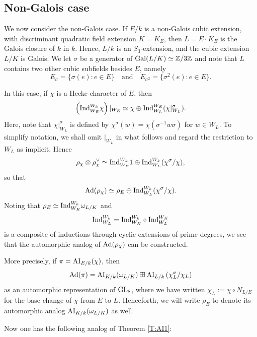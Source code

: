 \documentclass[11pt]{amsart}
\theoremstyle{plain}
\numberwithin{equation}{section}
\newcommand{\Z}{\mathbb Z}
\def\GL{{\rm GL}}
\def\Z{{\mathbb Z}}
\begin{document}
\vskip 5pt

\subsection{\bf Non-Galois case}
We now consider the non-Galois case. 
If $E/k$ is a non-Galois cubic extension, with discriminant quadratic field extension $K = K_E$, then $L = E \cdot K_E$ is the Galois closure of $k$ in $\overline{k}$. Hence,  $L/k$ is an $S_3$-extension, and the cubic extension $L/K$ is Galois. We let $\sigma$ be a generator of ${\rm Gal}(L/K) \simeq \Z/3\Z$ and note that $L$ contains two other cubic subfields besides $E$, namely 
\[ E_{\sigma} =\{ \sigma(e) : e \in E \} \quad \text{and} \quad  E_{\sigma^2} = \{ \sigma^2(e): e \in E\}. \]
\vskip 5pt

In this case, if $\chi$ is a Hecke character of $E$, then 
\[ \left( {\rm Ind}_{W_E}^{W_k} \chi \right)|_{W_E} \simeq \chi \oplus {\rm Ind}_{W_L}^{W_E} (\chi|_{W_L}^{\sigma}). \]
Here, note that $\chi|_{W_L}^{\sigma}$  is  defined by $\chi^{\sigma}(w) = \chi(\sigma^{-1}w \sigma)$  for  $w \in W_L$. To simplify notation, we shall omit $|_{W_L}$ in what follows and regard the restriction to $W_L$ as implicit.
Hence
\[  \rho_{\chi} \otimes \rho_{\chi}^{\vee} \simeq  {\rm Ind}_{W_E}^{W_k} 1  \oplus  {\rm Ind}_{W_L}^{W_k}  (\chi^{\sigma}/ \chi),\]
so that
\[  {\rm Ad}(\rho_{\chi}) \simeq  \rho_E \oplus {\rm Ind}_{W_L}^{W_k}  (\chi^{\sigma}/ \chi). \]
Noting that $\rho_E \simeq {\rm Ind}_{W_K}^{W_k} \omega_{L/K}$ and 
\[  {\rm Ind}_{W_L}^{W_k}  = {\rm Ind}_{W_K}^{W_k}  \circ {\rm Ind}_{W_L}^{W_K} \]
is a composite of inductions through cyclic extensions of prime degrees, we see that the automorphic analog of ${\rm Ad}(\rho_{\chi})$ can be constructed.

\vskip 5pt

More precisely, if $\pi = {\rm AI}_{E/k}(\chi)$, then
\begin{equation} \label{E:Add2}
  {\rm Ad}(\pi)  =  {\rm AI}_{K/k}(\omega_{L/K})  \boxplus {\rm AI}_{L/k}\left(  \chi_L^{\sigma} / \chi_L \right) \end{equation}
as an automorphic representation of $\GL_8$, where we have written $\chi_L := \chi \circ N_{L/E}$ for the base change of $\chi$ from $E$ to $L$.
Henceforth, we will write $\rho_E$ to denote its automorphic analog $ {\rm AI}_{K/k}(\omega_{L/K})$ as well.  
 

\vskip 5pt

Now one has the following analog of Theorem \ref{T:AI1}:
\vskip 5pt
\end{document}
